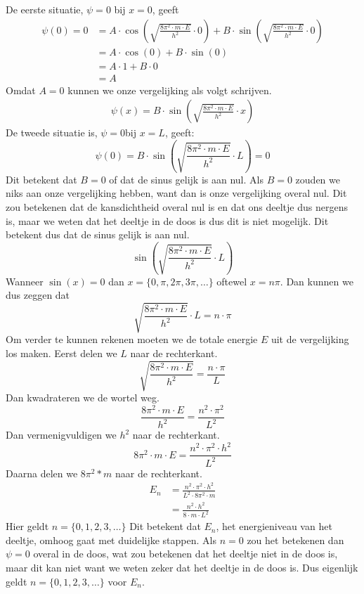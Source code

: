 \documentclass[11pt,fleqn]{book} %
\begin{document}
De eerste situatie, $\psi=0$ bij $x=0$, geeft
\begin{align*}
\psi(0) = 0 &= A\cdot\cos{\left(\sqrt{\frac{8\pi^2\cdot m\cdot E}{h^2}}\cdot 0\right)}+B\cdot\sin{\left(\sqrt{\frac{8\pi^2\cdot m\cdot E}{h^2}}\cdot 0\right)}\\
& = A\cdot\cos{(0)}+B\cdot\sin{(0)}\\
&= A\cdot 1+B\cdot 0\\
&= A
\end{align*}
Omdat $A=0$ kunnen we onze vergelijking als volgt schrijven.
\begin{align}\label{eq:psib}
\psi(x)=B\cdot\sin{\left(\sqrt{\frac{8\pi^2\cdot m\cdot E}{h^2}}\cdot x\right)}
\end{align}
De tweede situatie is, $\psi=0 $bij $x=L$, geeft:
\begin{displaymath}
\psi(0)=B\cdot\sin{\left(\sqrt{\frac{8\pi^2\cdot m\cdot E}{h^2}}\cdot L\right)}=0
\end{displaymath}
Dit betekent dat $B=0$ of dat de sinus gelijk is aan nul. Als $B=0$ zouden we niks aan onze vergelijking hebben, want dan is onze vergelijking overal nul. Dit zou betekenen dat de kansdichtheid overal nul is en dat ons deeltje dus nergens is, maar we weten dat het deeltje in de doos is dus dit is niet mogelijk. Dit betekent dus dat de sinus gelijk is aan nul.
\begin{displaymath}
\sin{\left(\sqrt{\frac{8\pi^2\cdot m\cdot E}{h^2}}\cdot L\right)}
\end{displaymath}
Wanneer $\sin{(x)}=0$ dan $x=\{0, \pi, 2\pi, 3\pi,\ldots\} $ oftewel $x = n\pi$. Dan kunnen we dus zeggen dat
\begin{displaymath}
\sqrt{\frac{8\pi^2\cdot m\cdot E}{h^2}}\cdot L=n\cdot \pi
\end{displaymath}
Om verder te kunnen rekenen moeten we de totale energie $E$ uit de vergelijking los maken.
Eerst delen we $L$ naar de rechterkant.
\begin{displaymath}
\sqrt{\frac{8\pi^2\cdot m\cdot E}{h^2}}=\frac{n\cdot \pi}{L}
\end{displaymath}
Dan kwadrateren we de wortel weg.
\begin{displaymath}
\frac{8\pi^2\cdot m\cdot E}{h^2}=\frac{n^2\cdot \pi^2}{L^2}
\end{displaymath}
Dan vermenigvuldigen we $h^2$ naar de rechterkant.
\begin{displaymath}
8\pi^2\cdot m\cdot E=\frac{n^2\cdot\pi^2\cdot h^2}{L^2}
\end{displaymath}
Daarna delen we $8\pi^2*m$ naar de rechterkant.
\begin{align*}
E_n &= \frac{n^2\cdot\pi^2\cdot h^2}{L^2\cdot 8\pi^2\cdot m}\\
&= \frac{n^2\cdot h^2}{8\cdot m\cdot L^2}
\end{align*}
Hier geldt $n=\{0, 1, 2, 3, \ldots\}$ Dit betekent dat $E_n$, het energieniveau van het deeltje, omhoog gaat met duidelijke stappen. Als $n=0$ zou het betekenen dan $\psi=0$ overal in de doos, wat zou betekenen dat het deeltje niet in de doos is, maar dit kan niet want we weten zeker dat het deeltje in de doos is. Dus eigenlijk geldt $n=\{0, 1, 2, 3, \ldots\}$ voor $E_n$.
\end{document}
